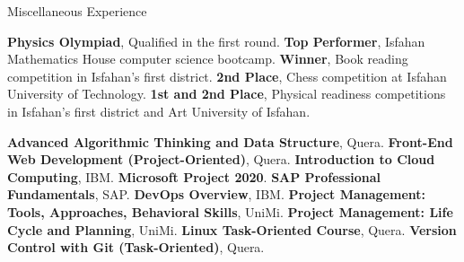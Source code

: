 \begin{rubric}{Miscellaneous Experience}


\entry*[2017] \textbf{Physics Olympiad}, Qualified in the first round.  
\entry*[2016] \textbf{Top Performer}, Isfahan Mathematics House computer science bootcamp.  
\entry*[2014] \textbf{Winner}, Book reading competition in Isfahan's first district.  
\entry*[2021] \textbf{2nd Place}, Chess competition at Isfahan University of Technology.  
\entry*[2012 - 2014] \textbf{1st and 2nd Place}, Physical readiness competitions in Isfahan’s first district and Art University of Isfahan.


\entry*[Feb 2024] \textbf{Advanced Algorithmic Thinking and Data Structure}, Quera.  
\entry*[Feb 2024] \textbf{Front-End Web Development (Project-Oriented)}, Quera.  
\entry*[Jan 2024] \textbf{Introduction to Cloud Computing}, IBM.  
\entry*[Dec 2023] \textbf{Microsoft Project 2020}.  
\entry*[Nov 2023] \textbf{SAP Professional Fundamentals}, SAP.  
\entry*[Jul 2023] \textbf{DevOps Overview}, IBM.  
\entry*[Mar 2023] \textbf{Project Management: Tools, Approaches, Behavioral Skills}, UniMi.  
\entry*[Jan 2023] \textbf{Project Management: Life Cycle and Planning}, UniMi.  
\entry*[Feb 2023] \textbf{Linux Task-Oriented Course}, Quera.  
\entry*[Dec 2022] \textbf{Version Control with Git (Task-Oriented)}, Quera.

\end{rubric}

